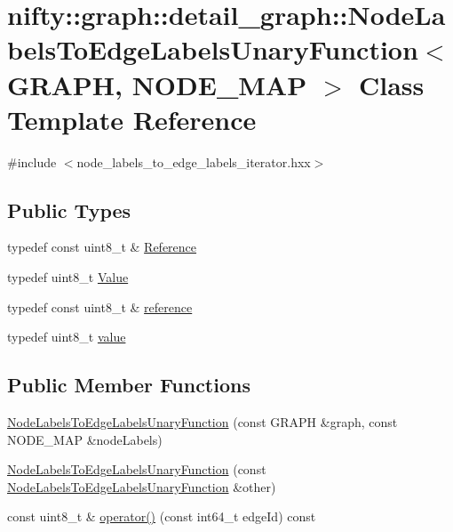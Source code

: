 \hypertarget{classnifty_1_1graph_1_1detail__graph_1_1NodeLabelsToEdgeLabelsUnaryFunction}{}\section{nifty\+:\+:graph\+:\+:detail\+\_\+graph\+:\+:Node\+Labels\+To\+Edge\+Labels\+Unary\+Function$<$ G\+R\+A\+PH, N\+O\+D\+E\+\_\+\+M\+AP $>$ Class Template Reference}
\label{classnifty_1_1graph_1_1detail__graph_1_1NodeLabelsToEdgeLabelsUnaryFunction}


{\ttfamily \#include $<$node\+\_\+labels\+\_\+to\+\_\+edge\+\_\+labels\+\_\+iterator.\+hxx$>$}

\subsection*{Public Types}
\begin{DoxyCompactItemize}
\item 
typedef const uint8\+\_\+t \& \hyperlink{classnifty_1_1graph_1_1detail__graph_1_1NodeLabelsToEdgeLabelsUnaryFunction_a50e0f9bfa5b0ce4c60fb0f010cd15110}{Reference}
\item 
typedef uint8\+\_\+t \hyperlink{classnifty_1_1graph_1_1detail__graph_1_1NodeLabelsToEdgeLabelsUnaryFunction_a69f2d0e0bef04e6172466755efee4a8e}{Value}
\item 
typedef const uint8\+\_\+t \& \hyperlink{classnifty_1_1graph_1_1detail__graph_1_1NodeLabelsToEdgeLabelsUnaryFunction_a298c22998b3dcc8aea86f29bb0e9c9b7}{reference}
\item 
typedef uint8\+\_\+t \hyperlink{classnifty_1_1graph_1_1detail__graph_1_1NodeLabelsToEdgeLabelsUnaryFunction_ab0985d82c405b9b0e4422751a2a8b18b}{value}
\end{DoxyCompactItemize}
\subsection*{Public Member Functions}
\begin{DoxyCompactItemize}
\item 
\hyperlink{classnifty_1_1graph_1_1detail__graph_1_1NodeLabelsToEdgeLabelsUnaryFunction_a27e93a8f9e44784d8c17e40fbf295db8}{Node\+Labels\+To\+Edge\+Labels\+Unary\+Function} (const G\+R\+A\+PH \&graph, const N\+O\+D\+E\+\_\+\+M\+AP \&node\+Labels)
\item 
\hyperlink{classnifty_1_1graph_1_1detail__graph_1_1NodeLabelsToEdgeLabelsUnaryFunction_a9325812abd92290323172cb501929d36}{Node\+Labels\+To\+Edge\+Labels\+Unary\+Function} (const \hyperlink{classnifty_1_1graph_1_1detail__graph_1_1NodeLabelsToEdgeLabelsUnaryFunction}{Node\+Labels\+To\+Edge\+Labels\+Unary\+Function} \&other)
\item 
const uint8\+\_\+t \& \hyperlink{classnifty_1_1graph_1_1detail__graph_1_1NodeLabelsToEdgeLabelsUnaryFunction_a0e986e012abec9583a858ac3d3c882d7}{operator()} (const int64\+\_\+t edge\+Id) const
\end{DoxyCompactItemize}


